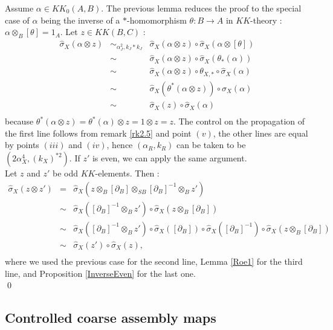 \begin{dem}
Assume $\alpha\in KK_0(A,B)$. The previous lemma reduces the proof to the special case of $\alpha$ being the inverse of a $*$-homomorphism $\theta : B\rightarrow A$ in $KK$-theory : $\alpha\otimes_B [\theta]=1_A$. Let $z\in KK(B,C)$ :
\[\begin{array}{rcl}
\hat\sigma_X (\alpha\otimes z) & \sim_{\alpha_J^2,k_J*k_J} &  \hat\sigma_X (\alpha\otimes z)\circ \hat\sigma_X (\alpha\otimes [\theta]) \\
			& \sim & \hat\sigma_X (\alpha\otimes z)\circ \hat\sigma_X (\theta_*(\alpha))\\
			& \sim & \hat\sigma_X (\alpha\otimes z)\circ \theta_{X,*}\circ \hat\sigma_X (\alpha)\\
			& \sim & \hat\sigma_X (\theta^*(\alpha\otimes z))\circ \hat\sigma_X (\alpha)\\
			& \sim & \hat\sigma_X (z)\circ \hat\sigma_X (\alpha) \\
\end{array}\] 
because $\theta^*(\alpha\otimes z)=\theta^*(\alpha)\otimes z=1\otimes z =z$. The control on the propagation of the first line follows from remark \ref{rk2.5} and point $(v)$, the other lines are equal by points $(iii)$ and $(iv)$, hence $(\alpha_R,k_R)$ can be taken to be $(2 \alpha_X^{4},( k_X)^{*2})$. If $z'$ is even, we can apply the same argument.\\

Let $z$ and $z'$ be odd $KK$-elements. Then :
\[\begin{array}{rcl}
\hat\sigma_X (z\otimes z') & = &  \hat\sigma_X (z\otimes_B [\partial_{B}]\otimes_{SB} [\partial_B]^{-1}\otimes_B z') \\
			& \sim & \hat\sigma_X ( [\partial_B]^{-1}\otimes_B z')\circ \hat\sigma_X (z\otimes_B [\partial_{B}])\\
			& \sim & \hat\sigma_X ( [\partial_B]^{-1}\otimes_B z')\circ \hat\sigma_X ( [\partial_B])\circ\hat\sigma_X( [\partial_B]^{-1})\circ \hat\sigma_X (z\otimes_B [\partial_{B}])\\		
			& \sim & \hat\sigma_X (  z')\circ \hat\sigma_X (z),\\
\end{array}\] 
where we used the previous case for the second line, Lemma \ref{Roe1} for the third line, and Proposition \ref{InverseEven} for the last one.\\
\qed
\end{dem}

\subsection{Controlled coarse assembly maps}

